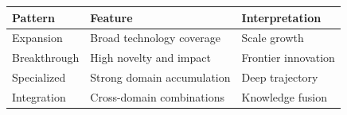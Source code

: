 
\begin{tabular}{lll}
\toprule
Pattern & Feature & Interpretation\\
\midrule
Expansion & Broad technology coverage & Scale growth\\
Breakthrough & High novelty and impact & Frontier innovation\\
Specialized & Strong domain accumulation & Deep trajectory\\
Integration & Cross-domain combinations & Knowledge fusion\\
\bottomrule
\end{tabular}
